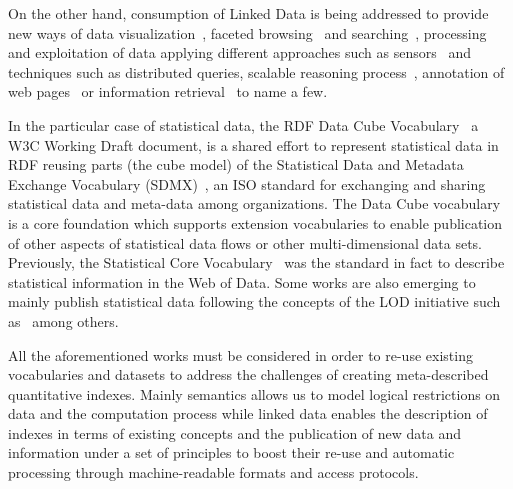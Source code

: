 On the other hand, consumption of Linked Data is being addressed to provide new ways of data visualization~\cite{DBLP:journals/semweb/DadzieR11}, 
faceted browsing~\cite{Pietriga06fresnel} and searching~\cite{hoga-etal-2011-swse-JWS}, processing~\cite{Harth:2011:SIP:1963192.1963318} and exploitation of data applying 
different approaches such as sensors~\cite{Jeung:2010:EMM:1850003.1850235} and techniques  such as distributed 
queries\cite{Hartig09executingsparql}, scalable reasoning process~\cite{DBLP:conf/semweb/HoganPPD10}, 
annotation of web pages~\cite{rdfa-primer} or information retrieval~\cite{Pound} to name a few.

In the particular case of statistical data, the RDF Data Cube Vocabulary~\cite{rdf-data-cube}
a W3C Working Draft document, is a shared effort to represent statistical data in RDF reusing parts (the cube model) 
of the Statistical Data and Metadata Exchange Vocabulary (SDMX)~\cite{sdmx}, an ISO standard 
for exchanging and sharing statistical data and meta-data among organizations. The Data Cube vocabulary is a core 
foundation which supports extension vocabularies to enable publication of other aspects of statistical data flows or 
other multi-dimensional data sets. Previously, the Statistical Core Vocabulary~\cite{scovo} was the standard in fact to describe statistical information in the Web of Data.
Some works are also emerging to mainly publish statistical data following the concepts of the LOD initiative 
such as~\cite{DBLP:conf/semweb/ZapilkoM11,DBLP:journals/ijsc/SalasMBCMA12,DDI2013,DBLP:conf/dgo/FernandezMG11,webindexlod} 
among others.

All the aforementioned works must be considered in order to re-use existing vocabularies and datasets to address 
the challenges of creating meta-described quantitative indexes. Mainly semantics allows us to model logical restrictions 
on data and the computation process while linked data enables the description of indexes in terms of existing concepts and 
the publication of new data and information under a set of principles to boost their re-use and automatic 
processing through machine-readable formats and access protocols.


